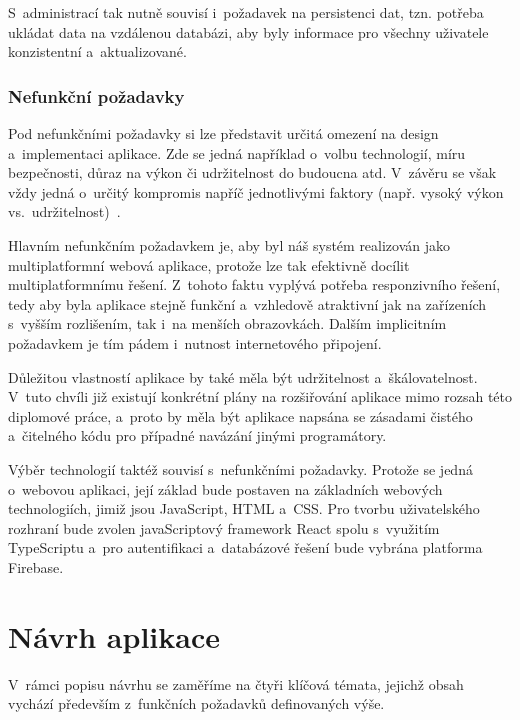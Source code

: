 S~administrací tak nutně souvisí i~požadavek na persistenci dat, tzn. potřeba ukládat data na vzdálenou databázi, aby byly informace pro všechny uživatele konzistentní a~aktualizované.

\hypertarget{nefunkux10dnuxed-poux17eadavky}{%
\subsection{Nefunkční požadavky}\label{nefunkux10dnuxed-poux17eadavky}}

Pod nefunkčními požadavky si lze představit určitá omezení na design a~implementaci aplikace. Zde se jedná například o~volbu technologií, míru bezpečnosti, důraz na výkon či udržitelnost do budoucna atd. V~závěru se však vždy jedná o~určitý kompromis napříč jednotlivými faktory (např. vysoký výkon vs.~udržitelnost)~\parencite{Gorton2006}.

Hlavním nefunkčním požadavkem je, aby byl náš systém realizován jako multiplatformní webová aplikace, protože lze tak efektivně docílit multiplatformnímu řešení. Z~tohoto faktu vyplývá potřeba responzivního řešení, tedy aby byla aplikace stejně funkční a~vzhledově atraktivní jak na zařízeních s~vyšším rozlišením, tak i~na menších obrazovkách. Dalším implicitním požadavkem je tím pádem i~nutnost internetového připojení.

Důležitou vlastností aplikace by také měla být udržitelnost a~škálovatelnost. V~tuto chvíli již existují konkrétní plány na rozšiřování aplikace mimo rozsah této diplomové práce, a~proto by měla být aplikace napsána se zásadami čistého a~čitelného kódu pro případné navázání jinými programátory.

Výběr technologií taktéž souvisí s~nefunkčními požadavky. Protože se jedná o~webovou aplikaci, její základ bude postaven na základních webových technologiích, jimiž jsou JavaScript, HTML a~CSS. Pro tvorbu uživatelského rozhraní bude zvolen javaScriptový framework React spolu s~využitím TypeScriptu a~pro autentifikaci a~databázové řešení bude vybrána platforma Firebase.

\hypertarget{nuxe1vrh-aplikace}{%
\chapter{Návrh aplikace}\label{nuxe1vrh-aplikace}}

V~rámci popisu návrhu se zaměříme na čtyři klíčová témata, jejichž obsah vychází především z~funkčních požadavků definovaných výše.


